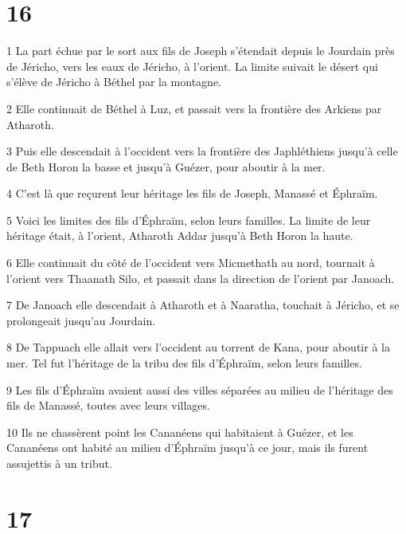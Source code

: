 \chapter{16}

\par 1 La part échue par le sort aux fils de Joseph s'étendait depuis le Jourdain près de Jéricho, vers les eaux de Jéricho, à l'orient. La limite suivait le désert qui s'élève de Jéricho à Béthel par la montagne.
\par 2 Elle continuait de Béthel à Luz, et passait vers la frontière des Arkiens par Atharoth.
\par 3 Puis elle descendait à l'occident vers la frontière des Japhléthiens jusqu'à celle de Beth Horon la basse et jusqu'à Guézer, pour aboutir à la mer.
\par 4 C'est là que reçurent leur héritage les fils de Joseph, Manassé et Éphraïm.
\par 5 Voici les limites des fils d'Éphraïm, selon leurs familles. La limite de leur héritage était, à l'orient, Atharoth Addar jusqu'à Beth Horon la haute.
\par 6 Elle continuait du côté de l'occident vers Micmethath au nord, tournait à l'orient vers Thaanath Silo, et passait dans la direction de l'orient par Janoach.
\par 7 De Janoach elle descendait à Atharoth et à Naaratha, touchait à Jéricho, et se prolongeait jusqu'au Jourdain.
\par 8 De Tappuach elle allait vers l'occident au torrent de Kana, pour aboutir à la mer. Tel fut l'héritage de la tribu des fils d'Éphraïm, selon leurs familles.
\par 9 Les fils d'Éphraïm avaient aussi des villes séparées au milieu de l'héritage des fils de Manassé, toutes avec leurs villages.
\par 10 Ils ne chassèrent point les Cananéens qui habitaient à Guézer, et les Cananéens ont habité au milieu d'Éphraïm jusqu'à ce jour, mais ils furent assujettis à un tribut.

\chapter{17}

